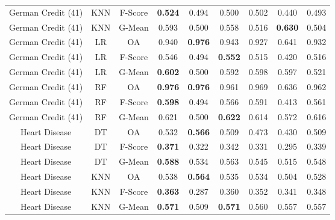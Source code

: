 \begin{longtable}{ccccccccc}
German Credit (41) &        KNN & F-Score & \textbf{0.524} &          0.494 &          0.500 &          0.502 &          0.440 &          0.493 \\
German Credit (41) &        KNN &  G-Mean &          0.593 &          0.500 &          0.558 &          0.516 & \textbf{0.630} &          0.504 \\
German Credit (41) &         LR &      OA &          0.940 & \textbf{0.976} &          0.943 &          0.927 &          0.641 &          0.932 \\
German Credit (41) &         LR & F-Score &          0.546 &          0.494 & \textbf{0.552} &          0.515 &          0.420 &          0.516 \\
German Credit (41) &         LR &  G-Mean & \textbf{0.602} &          0.500 &          0.592 &          0.598 &          0.597 &          0.521 \\
German Credit (41) &         RF &      OA & \textbf{0.976} & \textbf{0.976} &          0.961 &          0.969 &          0.636 &          0.962 \\
German Credit (41) &         RF & F-Score & \textbf{0.598} &          0.494 &          0.566 &          0.591 &          0.413 &          0.561 \\
German Credit (41) &         RF &  G-Mean &          0.621 &          0.500 & \textbf{0.622} &          0.614 &          0.572 &          0.616 \\
     Heart Disease &         DT &      OA &          0.532 & \textbf{0.566} &          0.509 &          0.473 &          0.430 &          0.509 \\
     Heart Disease &         DT & F-Score & \textbf{0.371} &          0.322 &          0.342 &          0.331 &          0.295 &          0.339 \\
     Heart Disease &         DT &  G-Mean & \textbf{0.588} &          0.534 &          0.563 &          0.545 &          0.515 &          0.548 \\
     Heart Disease &        KNN &      OA &          0.538 & \textbf{0.564} &          0.535 &          0.534 &          0.504 &          0.528 \\
     Heart Disease &        KNN & F-Score & \textbf{0.363} &          0.287 &          0.360 &          0.352 &          0.341 &          0.348 \\
     Heart Disease &        KNN &  G-Mean & \textbf{0.571} &          0.509 & \textbf{0.571} &          0.560 &          0.557 &          0.557 \\

\end{longtable}
